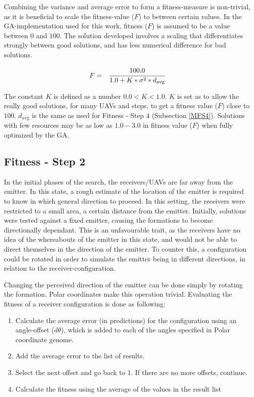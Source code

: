 \documentclass[10pt,a4paper]{book}
\begin{document}
Combining the variance and average error to form a fitness-measure is non-trivial, as it is beneficial to scale the fitness-value ($F$) to between certain values. In the \gls{GA}-implementation used for this work, fitness ($F$) is assumed to be a value between $0$ and $100$. The solution developed involves a scaling that differentiates strongly between good solutions, and has less numerical difference for bad solutions.


\begin{eqnarray}
F &=& \cfrac{100.0}{1.0 + K * \sigma^2 * d_\text{avg}} \nonumber
\end{eqnarray}

The constant $K$ is defined as a number $0.0 < K < 1.0$. $K$ is set as to allow the really good solutions, for many \glspl{UAV} and steps, to get a fitness value ($F$) close to $100$. $d_\text{avg}$ is the same as used for Fitness - Step 4 (Subsection \ref{MFS4}). Solutions with few resources may be as low as $1.0-3.0$ in fitness value ($F$) when fully optimized by the \gls{GA}.



\newpage

\subsection{Fitness - Step 2}
\label{MFS2}


In the initial phases of the search, the receivers/\glspl{UAV} are far away from the emitter. In this state, a rough estimate of the location of the emitter is required to know in which general direction to proceed. In this setting, the receivers were restricted to a small area, a certain distance from the emitter. Initially, solutions were tested against a fixed emitter, causing the formations to become directionally dependant. This is an unfavourable trait, as the receivers have no idea of the whereabouts of the emitter in this state, and would not be able to direct themselves in the direction of the emitter. To counter this, a configuration could be rotated in order to simulate the emitter being in different directions, in relation to the receiver-configuration. 

Changing the perceived direction of the emitter can be done simply by rotating the formation. Polar coordinates make this operation trivial. Evaluating the fitness of a receiver configuration is done as following:

\begin{enumerate}
\item Calculate the average error (in predictions) for the configuration using an angle-offset ($d\theta$), which is added to each of the angles specified in Polar coordinate genome.
\item Add the average error to the list of results.
\item Select the next offset and go back to 1. If there are no more offsets, continue.
\item Calculate the fitness using the average of the values in the result list
\end{enumerate}
\end{document}

